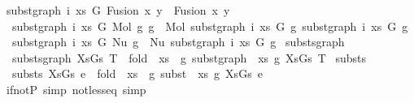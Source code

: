 \begin{isabellebody}
{\isacharbar}{\kern0pt}\ {\isachardoublequoteopen}subst{\isacharunderscore}{\kern0pt}graph\ i\ xs\ G\ {\isacharparenleft}{\kern0pt}Fusion\ x\ y{\isacharparenright}{\kern0pt}\ {\isacharequal}{\kern0pt}\ Fusion\ x\ y{\isachardoublequoteclose}\isanewline
\ {\isacharbar}{\kern0pt}\ {\isachardoublequoteopen}subst{\isacharunderscore}{\kern0pt}graph\ i\ xs\ G\ {\isacharparenleft}{\kern0pt}Mol\ g{}\ g{}{\isacharparenright}{\kern0pt}\ {\isacharequal}{\kern0pt}\ Mol\ {\isacharparenleft}{\kern0pt}subst{\isacharunderscore}{\kern0pt}graph\ i\ xs\ G\ g{}{\isacharparenright}{\kern0pt}\ {\isacharparenleft}{\kern0pt}subst{\isacharunderscore}{\kern0pt}graph\ i\ xs\ G\ g{}{\isacharparenright}{\kern0pt}{\isachardoublequoteclose}\isanewline
\ {\isacharbar}{\kern0pt}\ {\isachardoublequoteopen}subst{\isacharunderscore}{\kern0pt}graph\ i\ xs\ G\ {\isacharparenleft}{\kern0pt}Nu\ g{\isacharparenright}{\kern0pt}\ {\isacharequal}{\kern0pt}\ Nu\ {\isacharparenleft}{\kern0pt}subst{\isacharunderscore}{\kern0pt}graph\ i\ xs\ G\ g{\isacharparenright}{\kern0pt}{\isachardoublequoteclose}\isanewline
\isanewline
\isanewline
{}\isamarkupfalse%
\ substs{\isacharunderscore}{\kern0pt}graph{\isacharcolon}{\kern0pt}\isanewline
\ \ {\isachardoublequoteopen}substs{\isacharunderscore}{\kern0pt}graph\ XsGs\ T\ {\isacharequal}{\kern0pt}\ fold\ {\isacharparenleft}{\kern0pt}{\isasymlambda}\ {\isacharparenleft}{\kern0pt}{\isacharparenleft}{\kern0pt}xs{\isacharcomma}{\kern0pt}\ {\isacharunderscore}{\kern0pt}{\isacharparenright}{\kern0pt}{\isacharcomma}{\kern0pt}\ g{\isacharparenright}{\kern0pt}{\isachardot}{\kern0pt}\ subst{\isacharunderscore}{\kern0pt}graph\ {}\ xs\ g{\isacharparenright}{\kern0pt}\ XsGs\ T{\isachardoublequoteclose}\isanewline
\isanewline
{}\isamarkupfalse%
\ substs{\isacharcolon}{\kern0pt}\isanewline
\ \ {\isachardoublequoteopen}substs\ XsGs\ e\ {\isacharequal}{\kern0pt}\ fold\ {\isacharparenleft}{\kern0pt}{\isasymlambda}\ {\isacharparenleft}{\kern0pt}{\isacharparenleft}{\kern0pt}xs{\isacharcomma}{\kern0pt}\ {\isacharunderscore}{\kern0pt}{\isacharparenright}{\kern0pt}{\isacharcomma}{\kern0pt}\ g{\isacharparenright}{\kern0pt}{\isachardot}{\kern0pt}\ subst\ {}\ xs\ g{\isacharparenright}{\kern0pt}\ XsGs\ e{\isachardoublequoteclose}\isanewline
\isanewline
\isanewline
\isanewline
\isanewline
\isanewline
{}\isamarkupfalse%
\ if{\isacharunderscore}{\kern0pt}not{\isacharunderscore}{\kern0pt}P\ {\isacharbrackleft}{\kern0pt}simp{\isacharbrackright}{\kern0pt}\ not{\isacharunderscore}{\kern0pt}less{\isacharunderscore}{\kern0pt}eq\ {\isacharbrackleft}{\kern0pt}simp{\isacharbrackright}{\kern0pt}\isanewline

\end{isabellebody}
